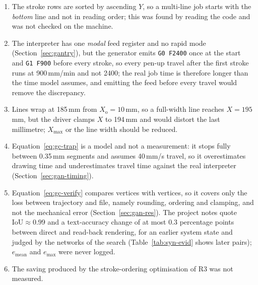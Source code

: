 \begin{enumerate}\setlength{\itemsep}{0pt}\setlength{\parskip}{0pt}
\item The stroke rows are sorted by ascending $Y$, so a multi-line job starts with the \emph{bottom} line and not in reading order; this was found by reading the code and was not checked on the machine.
\item The interpreter has one \emph{modal} feed register and no rapid mode (Section~\ref{sec:gantry}), but the generator emits \texttt{G0 F2400} once at the start and \texttt{G1 F900} before every stroke, so every pen-up travel after the first stroke runs at 900\,mm/min and not 2400; the real job time is therefore longer than the time model assumes, and emitting the feed before every travel would remove the discrepancy.
\item Lines wrap at 185\,mm from $X_{\mathrm o}=10$\,mm, so a full-width line reaches $X=195$\,mm, but the driver clamps $X$ to 194\,mm and would distort the last millimetre; $X_{\max}$ or the line width should be reduced.
\item Equation~\ref{eq:gc-trap} is a model and not a measurement: it stops fully between 0.35\,mm segments and assumes 40\,mm/s travel, so it overestimates drawing time and underestimates travel time against the real interpreter (Section~\ref{sec:gan-timing}).
\item Equation~\ref{eq:gc-verify} compares vertices with vertices, so it covers only the loss between trajectory and file, namely rounding, ordering and clamping, and not the mechanical error (Section~\ref{sec:gan-res}). The project notes quote $\mathrm{IoU}\approx0.99$ and a text-accuracy change of at most 0.3 percentage points between direct and read-back rendering, for an earlier system state and judged by the networks of the search (Table~\ref{tab:syn-evid} shows later pairs); $e_{\mathrm{mean}}$ and $e_{\max}$ were never logged.
\item The saving produced by the stroke-ordering optimisation of R3 was not measured.
\end{enumerate}
